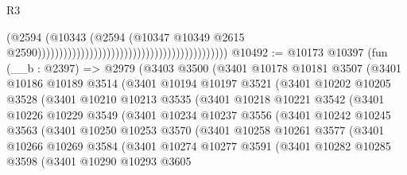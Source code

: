 \begin{lexlean}{R3}
\begin{coremodule}
                                                                                    (@2594
                                                                                      (@10343
                                                                                        (@2594
                                                                                          (@10347
                                                                                            @10349
                                                                                            @2615
                                                                                            @2590))))))))))))))))))))))))))))))))))))))))))))
@10492 := @10173
    @10397
    (fun (__b : @2397) =>
    @2979
      (@3403
        @3500
        (@3401
          @10178
          @10181
          @3507
          (@3401
            @10186
            @10189
            @3514
            (@3401
              @10194
              @10197
              @3521
              (@3401
                @10202
                @10205
                @3528
                (@3401
                  @10210
                  @10213
                  @3535
                  (@3401
                    @10218
                    @10221
                    @3542
                    (@3401
                      @10226
                      @10229
                      @3549
                      (@3401
                        @10234
                        @10237
                        @3556
                        (@3401
                          @10242
                          @10245
                          @3563
                          (@3401
                            @10250
                            @10253
                            @3570
                            (@3401
                              @10258
                              @10261
                              @3577
                              (@3401
                                @10266
                                @10269
                                @3584
                                (@3401
                                  @10274
                                  @10277
                                  @3591
                                  (@3401
                                    @10282
                                    @10285
                                    @3598
                                    (@3401
                                      @10290
                                      @10293
                                      @3605

\end{coremodule}
\end{lexlean}
